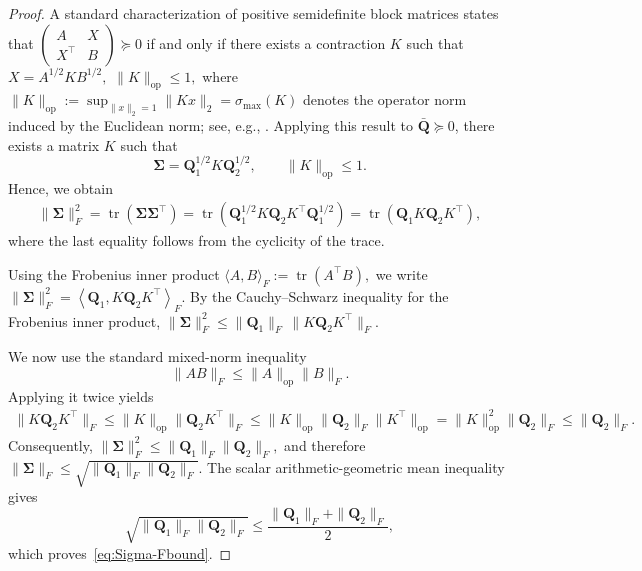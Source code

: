 \documentclass[opre,sglanonrev]{informs4}
\newcommand{\mbR}{\mathbb R}
\newcommand{\bQ}{\bm Q}
\newcommand{\bSigma}{\bm{\Sigma}}
\newcommand{\Tr}{\operatorname{tr}}
\begin{document}
{\begin{APPENDICES}
\begin{proof}

A standard characterization of positive semidefinite block matrices states that $\begin{pmatrix}
A & X\\
X^\top & B
\end{pmatrix}
\succeq 0$ if and only if there exists a contraction $K$ such that $X=A^{1/2}KB^{1/2},
\,\,
\|K\|_{\mathrm{op}}\le 1,$
where $\|K\|_{\mathrm{op}}
:=
\sup_{\|x\|_2=1}\|Kx\|_2
=
\sigma_{\max}(K)$
denotes the operator norm induced by the Euclidean norm; see, e.g.,
\cite[Proposition~1.3.2]{bhatia2009positive}. 
Applying this result to $\bar{\bQ}\succeq 0$, there exists a matrix $K$
such that 
\[
\bSigma
=
\bQ_1^{1/2}K\bQ_2^{1/2},
\qquad
\|K\|_{\mathrm{op}}\le 1.
\]
Hence, we obtain
\begin{align*}
\|\bSigma\|_F^2
=
\Tr(\bSigma\bSigma^\top)=
\Tr\!\left(
\bQ_1^{1/2}
K\bQ_2K^\top
\bQ_1^{1/2}
\right)=
\Tr\!\left(
\bQ_1K\bQ_2K^\top
\right),
\end{align*}
where the last equality follows from the cyclicity of the trace.

Using the Frobenius inner product $\langle A,B\rangle_F
:=
\Tr(A^\top B),$ we write $\|\bSigma\|_F^2
=
\left\langle
\bQ_1,
K\bQ_2K^\top
\right\rangle_F.$
By the Cauchy--Schwarz inequality for the Frobenius inner product, $\|\bSigma\|_F^2
\le
\|\bQ_1\|_F
\,
\|K\bQ_2K^\top\|_F.$ 

We now use the standard mixed-norm inequality
\[
\|AB\|_F
\le
\|A\|_{\mathrm{op}}\|B\|_F.
\]
Applying it twice yields
\begin{align*}
\|K\bQ_2K^\top\|_F
\le
\|K\|_{\mathrm{op}}
\|\bQ_2K^\top\|_F\le
\|K\|_{\mathrm{op}}
\|\bQ_2\|_F
\|K^\top\|_{\mathrm{op}}=
\|K\|_{\mathrm{op}}^2
\|\bQ_2\|_F\le
\|\bQ_2\|_F.
\end{align*}
Consequently, $\|\bSigma\|_F^2
\le
\|\bQ_1\|_F
\|\bQ_2\|_F,$ and therefore $\|\bSigma\|_F
\le
\sqrt{
\|\bQ_1\|_F
\|\bQ_2\|_F
}.$ 
The scalar arithmetic-geometric mean inequality gives
\[
\sqrt{
\|\bQ_1\|_F
\|\bQ_2\|_F
}
\le
\frac{
\|\bQ_1\|_F+\|\bQ_2\|_F
}{2},
\]
which proves~\eqref{eq:Sigma-Fbound}.


\end{proof}
\end{APPENDICES}}
\end{document}
